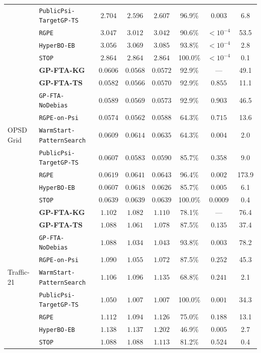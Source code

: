 \begin{table}[htbp]
{\begin{tabular}{llcccccc}
 & \texttt{PublicPsi-TargetGP-TS} & $2.704$ & $2.596$ & $2.607$ & 96.9\% & $0.003$ & 6.8 \\
 & \texttt{RGPE} & $3.047$ & $3.012$ & $3.042$ & 90.6\% & $<10^{-4}$ & 53.5 \\
 & \texttt{HyperBO-EB} & $3.056$ & $3.069$ & $3.085$ & 93.8\% & $<10^{-4}$ & 2.8 \\
 & \texttt{STOP} & $2.864$ & $2.864$ & $2.864$ & 100.0\% & $<10^{-4}$ & 0.1 \\
\midrule
\multirow{9}{*}{OPSD Grid} & \textbf{GP-FTA-KG} & $0.0606$ & $0.0568$ & $0.0572$ & 92.9\% & --- & 49.1 \\
 & \textbf{GP-FTA-TS} & $0.0582$ & $0.0566$ & $\mathbf{0.0570}$ & 92.9\% & $0.855$ & 11.1 \\
 & \texttt{GP-FTA-NoDebias} & $0.0589$ & $0.0569$ & $0.0573$ & 92.9\% & $0.903$ & 46.5 \\
 & \texttt{RGPE-on-Psi} & $\mathbf{0.0574}$ & $\mathbf{0.0562}$ & $0.0588$ & 64.3\% & $0.715$ & 13.6 \\
 & \texttt{WarmStart-PatternSearch} & $0.0609$ & $0.0614$ & $0.0635$ & 64.3\% & $0.004$ & 2.0 \\
 & \texttt{PublicPsi-TargetGP-TS} & $0.0607$ & $0.0583$ & $0.0590$ & 85.7\% & $0.358$ & 9.0 \\
 & \texttt{RGPE} & $0.0619$ & $0.0641$ & $0.0643$ & 96.4\% & $0.002$ & 173.9 \\
 & \texttt{HyperBO-EB} & $0.0607$ & $0.0618$ & $0.0626$ & 85.7\% & $0.005$ & 6.1 \\
 & \texttt{STOP} & $0.0639$ & $0.0639$ & $0.0639$ & 100.0\% & $0.0009$ & 0.4 \\
\midrule
\multirow{9}{*}{Traffic-21} & \textbf{GP-FTA-KG} & $1.102$ & $1.082$ & $1.110$ & 78.1\% & --- & 76.4 \\
 & \textbf{GP-FTA-TS} & $1.088$ & $1.061$ & $1.078$ & 87.5\% & $0.135$ & 37.4 \\
 & \texttt{GP-FTA-NoDebias} & $1.088$ & $1.034$ & $1.043$ & 93.8\% & $0.003$ & 78.2 \\
 & \texttt{RGPE-on-Psi} & $1.090$ & $1.055$ & $1.072$ & 87.5\% & $0.252$ & 45.3 \\
 & \texttt{WarmStart-PatternSearch} & $1.106$ & $1.096$ & $1.135$ & 68.8\% & $0.241$ & 2.1 \\
 & \texttt{PublicPsi-TargetGP-TS} & $\mathbf{1.050}$ & $\mathbf{1.007}$ & $\mathbf{1.007}$ & 100.0\% & $0.001$ & 34.3 \\
 & \texttt{RGPE} & $1.112$ & $1.094$ & $1.126$ & 75.0\% & $0.188$ & 13.1 \\
 & \texttt{HyperBO-EB} & $1.138$ & $1.137$ & $1.202$ & 46.9\% & $0.005$ & 2.7 \\
 & \texttt{STOP} & $1.088$ & $1.088$ & $1.113$ & 81.2\% & $0.524$ & 0.4 \\
\bottomrule
\end{tabular}%
}
\end{table}
